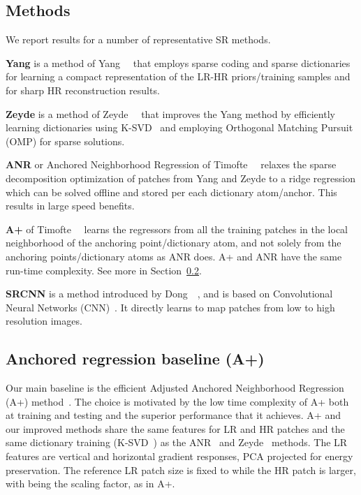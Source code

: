 \documentclass[10pt,twocolumn,letterpaper]{article}
\begin{document}
\subsection{Methods}
\label{ssc:methods}
We report results for a number of representative SR methods.

\noindent\textbf{Yang } is a method of Yang~\etal~\cite{Yang-CVPR-2008} that employs sparse coding and sparse dictionaries for learning a compact representation of the LR-HR priors/training samples and for sharp HR reconstruction results.

\noindent\textbf{Zeyde } is a method of Zeyde~\etal~\cite{Zeyde-CS-2012} that improves the Yang method by efficiently learning dictionaries using K-SVD~\cite{Aharon-TSP-2006} and employing Orthogonal Matching Pursuit (OMP) for sparse solutions.

\noindent\textbf{ANR } or Anchored Neighborhood Regression of Timofte~\etal~\cite{Timofte-ICCV-2013} relaxes the sparse decomposition optimization of patches from Yang and Zeyde to a ridge regression which can be solved offline and stored per each dictionary atom/anchor. This results in large speed benefits.

\noindent\textbf{A+ } of Timofte~\etal~\cite{Timofte-ACCV-2014} learns the regressors from all the training patches in the local neighborhood of the anchoring point/dictionary atom, and not solely from the anchoring points/dictionary atoms as ANR does. A+ and ANR have the same run-time complexity. See more in Section~\ref{sec:Aplus}.

\noindent\textbf{SRCNN } is a method introduced by Dong~\etal~\cite{Dong-ECCV-2014}, and is based on Convolutional Neural Networks (CNN)~\cite{LeCun-IEEE-1998}. It directly learns to map patches from low to high resolution images.

\subsection{Anchored regression baseline (A+)}
\label{sec:Aplus}
Our main baseline is the efficient Adjusted Anchored Neighborhood Regression (A+) method~\cite{Timofte-ACCV-2014}. The choice is motivated by the low time complexity of A+ both at training and testing and the superior performance that it achieves.
A+ and our improved methods share the same features for LR and HR patches and the same dictionary training (K-SVD~\cite{Aharon-TSP-2006}) as the ANR~\cite{Timofte-ICCV-2013} and Zeyde~\cite{Zeyde-CS-2012} methods.
The LR features are vertical and horizontal gradient responses, PCA projected for  energy preservation.
The reference LR patch size is fixed to  while the HR patch is  larger, with  being the scaling factor, as in A+.
\end{document}

